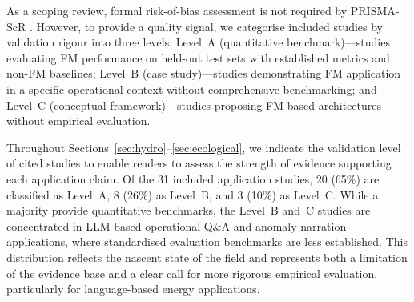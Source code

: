 \documentclass[preprint,12pt]{elsarticle}
\begin{document}
As a scoping review, formal risk-of-bias assessment is not required by PRISMA-ScR \cite{tricco2018prisma_scr}. However, to provide a quality signal, we categorise included studies by validation rigour into three levels: Level~A (quantitative benchmark)---studies evaluating FM performance on held-out test sets with established metrics and non-FM baselines; Level~B (case study)---studies demonstrating FM application in a specific operational context without comprehensive benchmarking; and Level~C (conceptual framework)---studies proposing FM-based architectures without empirical evaluation.

Throughout Sections~\ref{sec:hydro}--\ref{sec:ecological}, we indicate the validation level of cited studies to enable readers to assess the strength of evidence supporting each application claim. Of the 31 included application studies, 20 (65\%) are classified as Level~A, 8 (26\%) as Level~B, and 3 (10\%) as Level~C. While a majority provide quantitative benchmarks, the Level~B and~C studies are concentrated in LLM-based operational Q\&A and anomaly narration applications, where standardised evaluation benchmarks are less established. This distribution reflects the nascent state of the field and represents both a limitation of the evidence base and a clear call for more rigorous empirical evaluation, particularly for language-based energy applications.
\end{document}
